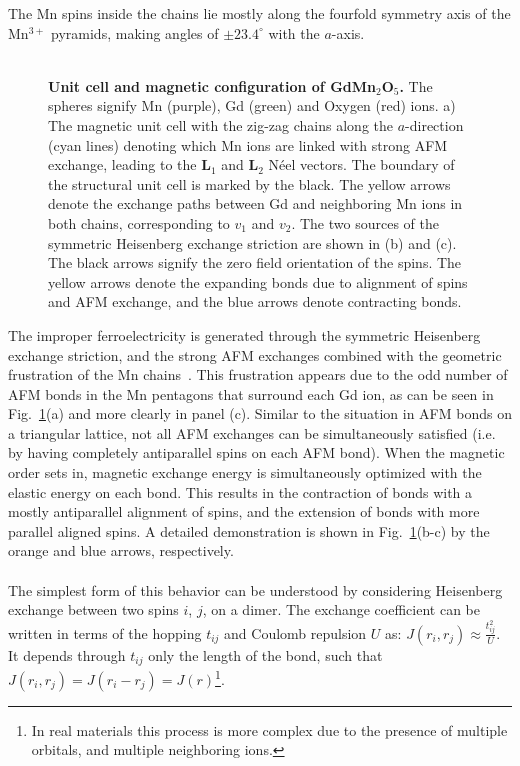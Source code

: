 The Mn spins inside the chains lie mostly along the fourfold symmetry axis of the Mn$^{3+}$ pyramids, making angles of $\pm 23.4^\circ$ with the $a$-axis.
\\\\
\begin{figure}
	\centering
	\caption{\label{fig:GdMn2O5_unit_cell}{\bf Unit cell and magnetic configuration of GdMn$_2$O$_5$.} The spheres signify Mn (purple), Gd (green) and Oxygen (red) ions. a) The magnetic unit cell with the zig-zag chains along the $a$-direction (cyan lines) denoting which Mn ions are linked with strong AFM exchange, leading to the $\bm{L}_1$ and $\bm{L}_2$ N\'eel vectors. The boundary of the structural unit cell is marked by the black. The yellow arrows denote the exchange paths between Gd and neighboring Mn ions in both chains, corresponding to $v_1$ and $v_2$. The two sources of the symmetric Heisenberg exchange striction are shown in (b) and (c). The black arrows signify the zero field orientation of the spins. The yellow arrows denote the expanding bonds due to alignment of spins and AFM exchange, and the blue arrows denote contracting bonds.}
\end{figure}
The improper ferroelectricity is generated through the symmetric Heisenberg exchange striction, and the strong AFM exchanges combined with the geometric frustration of the Mn chains~\cite{Choi2008}.
This frustration appears due to the odd number of AFM bonds in the Mn pentagons that surround each Gd ion, as can be seen in Fig.~\ref{fig:GdMn2O5_unit_cell}(a) and more clearly in panel (c).
Similar to the situation in AFM bonds on a triangular lattice, not all AFM exchanges can be simultaneously satisfied (i.e. by having completely antiparallel spins on each AFM bond).
When the magnetic order sets in, magnetic exchange energy is simultaneously optimized with the elastic energy on each bond.
This results in the contraction of bonds with a mostly antiparallel alignment of spins, and the extension of bonds with more parallel aligned spins.
A detailed demonstration is shown in Fig.~\ref{fig:GdMn2O5_unit_cell}(b-c) by the orange and blue arrows, respectively.
\\\\
The simplest form of this behavior can be understood by considering Heisenberg exchange between two spins $i$, $j$, on a dimer.
The exchange coefficient can be written in terms of the hopping $t_{ij}$ and Coulomb repulsion $U$ as: $J(r_i, r_j)\approx \frac{t_{ij}^2}{U}$.
It depends through $t_{ij}$ only the length of the bond, such that $J(r_i, r_j) = J(r_i - r_j) = J(r)$\footnote{In real materials this process is more complex due to the presence of multiple orbitals, and multiple neighboring ions.}.
